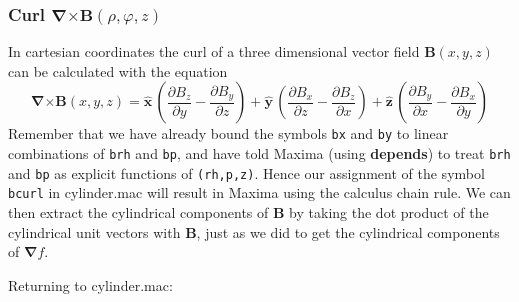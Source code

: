 \documentclass[12pt]{article}
\begin{document}
\subsubsection{Curl \quad $\boldsymbol{\nabla} \boldsymbol{\times}  \mathbf{B}(\rho,\varphi,z)$  }
In cartesian coordinates the curl of a three dimensional vector field 
  $\mathbf{B}(x,y,z)$ can be calculated with the equation
\begin{equation}
\boldsymbol{\nabla} \boldsymbol{\times} \mathbf{B}(x,y,z) =
 \mathbf{\hat{x}}\,\left( \frac{\partial B_z}{\partial y} - \frac{\partial B_y}{\partial z} \right) +
 \mathbf{\hat{y}}\,\left( \frac{\partial B_x}{\partial z} - \frac{\partial B_z}{\partial x} \right) +
 \mathbf{\hat{z}}\,\left( \frac{\partial B_y}{\partial x} - \frac{\partial B_x}{\partial y} \right)
\end{equation}  
Remember that we have already bound the symbols \verb|bx| and \verb|by| to
  linear combinations of \verb|brh| and \verb|bp|, and have told Maxima (using \textbf{depends})
  to treat \verb|brh| and \verb|bp| as explicit functions of \verb|(rh,p,z)|.
Hence our assignment of the symbol \verb|bcurl| in cylinder.mac will result in Maxima
  using the calculus chain rule.
We can then extract the cylindrical components of $\mathbf{B}$ by taking the
  dot product of the cylindrical unit vectors with $\mathbf{B}$, just as we did
  to get the cylindrical components of $\boldsymbol{\nabla}f$.
\smallskip
  
Returning to cylinder.mac:
\end{document}
